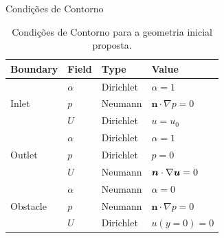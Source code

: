 \begin{frame}{Condições de Contorno}
    \begin{minipage}[c]{0.45\textwidth}
            \begin{table}[ht]
                \centering
                \caption{Condições de Contorno para a geometria inicial proposta.}
                \scriptsize
                \begin{tabular}{llll}
                \toprule
                Boundary                                                                       & Field    & Type      & Value \\ 
                \midrule
                \multirow{3}{*}{Inlet}                                                         & $\alpha$ & Dirichlet & $ \alpha = 1 $                                   \\ 
                                                                                               & $p$      & Neumann   & $\bm{n} \cdot \nabla p = 0 $                     \\  
                                                                                               & $U$      & Dirichlet & $ u = u_0 $                                      \\ 
                \midrule
                \multirow{3}{*}{Outlet}                                                        & $\alpha$ & Dirichlet & $ \alpha = 1 $                                   \\ 
                                                                                               & $p$      & Dirichlet & $ p = 0 $                                        \\  
                                                                                               & $U$      & Neumann   & $\bm{n} \cdot \nabla \bm{u} = 0 $            \\
                \midrule
                \multirow{3}{*}{Obstacle}                                                      & $\alpha$ & Neumann   & $ \alpha = 0 $                                   \\ 
                                                                                               & $p$      & Neumann   & $\bm{n} \cdot \nabla p = 0 $                     \\  
                                                                                               & $U$      & Dirichlet & $ u(y=0) = 0 $                                   \\

\end{tabular}
\end{table}
\end{minipage}
\end{frame}
